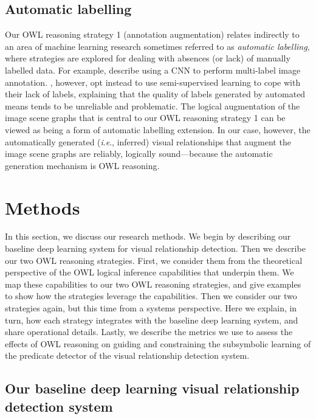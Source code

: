 \documentclass[]{jair}
\newcommand{\ie}{\textit{i}.\textit{e}.,\xspace}
\begin{document}
\subsection{Automatic labelling}
Our OWL reasoning strategy 1 (annotation augmentation) relates indirectly to an area of machine learning research sometimes referred to as \emph{automatic labelling}, where strategies are explored for dealing with absences (or lack) of manually labelled data.
For example, \citet{DBLP:conf/soict/LeNN16} describe using a CNN to perform multi-label image annotation.
\citet{DBLP:journals/corr/abs-2203-01524}, however, opt instead to use semi-supervised learning to cope with their lack of labels, explaining that the quality of labels generated by automated means tends to be unreliable and problematic.
The logical augmentation of the image scene graphs that is central to our OWL reasoning strategy 1 can be viewed as being a form of automatic labelling extension.
In our case, however, the automatically generated (\ie inferred) visual relationships that augment the image scene graphs are reliably, logically sound---because the automatic generation mechanism is OWL reasoning.







\section{Methods}
\label{sec:methods}

In this section, we discuss our research methods.
We begin by describing our baseline deep learning system for visual relationship detection.
Then we describe our two OWL reasoning strategies.
First, we consider them from the theoretical perspective of the OWL logical inference capabilities that underpin them.
We map these capabilities to our two OWL reasoning strategies, and give examples to show how the strategies leverage the capabilities.
Then we consider our two strategies again, but this time from a systems perspective.
Here we explain, in turn, how each strategy integrates with the baseline deep learning system, and share operational details.
Lastly, we describe the metrics we use to assess the effects of OWL reasoning on guiding and constraining the subsymbolic learning of the predicate detector of the visual relationship detection system.

\subsection{Our baseline deep learning visual relationship detection system}
\label{sec:baseline-system}
\end{document}
